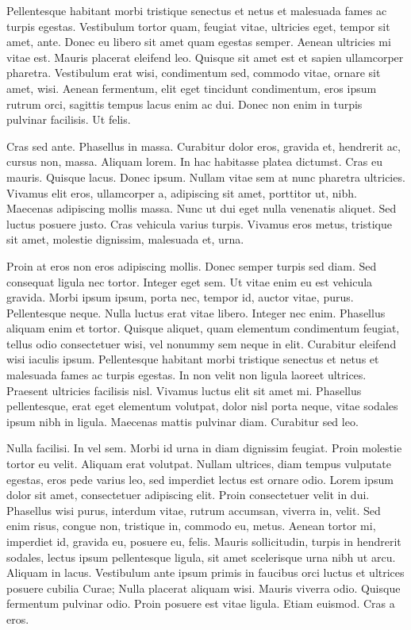 Pellentesque habitant morbi tristique senectus et netus et malesuada fames ac turpis egestas. Vestibulum tortor quam, feugiat vitae, ultricies eget, tempor sit amet, ante. Donec eu libero sit amet quam egestas semper. Aenean ultricies mi vitae est. Mauris placerat eleifend leo. Quisque sit amet est et sapien ullamcorper pharetra. Vestibulum erat wisi, condimentum sed, commodo vitae, ornare sit amet, wisi. Aenean fermentum, elit eget tincidunt condimentum, eros ipsum rutrum orci, sagittis tempus lacus enim ac dui. Donec non enim in turpis pulvinar facilisis. Ut felis.

Cras sed ante. Phasellus in massa. Curabitur dolor eros, gravida et, hendrerit ac, cursus non, massa. Aliquam lorem. In hac habitasse platea dictumst. Cras eu mauris. Quisque lacus. Donec ipsum. Nullam vitae sem at nunc pharetra ultricies. Vivamus elit eros, ullamcorper a, adipiscing sit amet, porttitor ut, nibh. Maecenas adipiscing mollis massa. Nunc ut dui eget nulla venenatis aliquet. Sed luctus posuere justo. Cras vehicula varius turpis. Vivamus eros metus, tristique sit amet, molestie dignissim, malesuada et, urna.

Proin at eros non eros adipiscing mollis. Donec semper turpis sed diam. Sed consequat ligula nec tortor. Integer eget sem. Ut vitae enim eu est vehicula gravida. Morbi ipsum ipsum, porta nec, tempor id, auctor vitae, purus. Pellentesque neque. Nulla luctus erat vitae libero. Integer nec enim. Phasellus aliquam enim et tortor. Quisque aliquet, quam elementum condimentum feugiat, tellus odio consectetuer wisi, vel nonummy sem neque in elit. Curabitur eleifend wisi iaculis ipsum. Pellentesque habitant morbi tristique senectus et netus et malesuada fames ac turpis egestas. In non velit non ligula laoreet ultrices. Praesent ultricies facilisis nisl. Vivamus luctus elit sit amet mi. Phasellus pellentesque, erat eget elementum volutpat, dolor nisl porta neque, vitae sodales ipsum nibh in ligula. Maecenas mattis pulvinar diam. Curabitur sed leo.

Nulla facilisi. In vel sem. Morbi id urna in diam dignissim feugiat. Proin molestie tortor eu velit. Aliquam erat volutpat. Nullam ultrices, diam tempus vulputate egestas, eros pede varius leo, sed imperdiet lectus est ornare odio. Lorem ipsum dolor sit amet, consectetuer adipiscing elit. Proin consectetuer velit in dui. Phasellus wisi purus, interdum vitae, rutrum accumsan, viverra in, velit. Sed enim risus, congue non, tristique in, commodo eu, metus. Aenean tortor mi, imperdiet id, gravida eu, posuere eu, felis. Mauris sollicitudin, turpis in hendrerit sodales, lectus ipsum pellentesque ligula, sit amet scelerisque urna nibh ut arcu. Aliquam in lacus. Vestibulum ante ipsum primis in faucibus orci luctus et ultrices posuere cubilia Curae; Nulla placerat aliquam wisi. Mauris viverra odio. Quisque fermentum pulvinar odio. Proin posuere est vitae ligula. Etiam euismod. Cras a eros.


